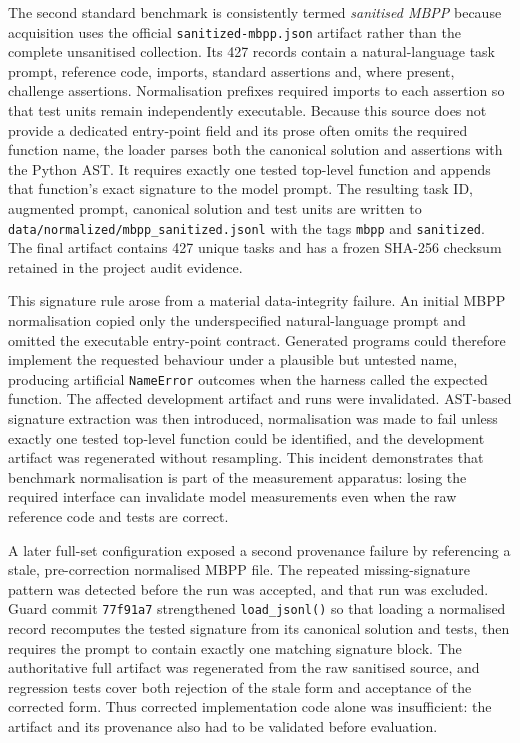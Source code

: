 The second standard benchmark is consistently termed \emph{sanitised MBPP} because acquisition uses the official \texttt{sanitized-mbpp.json} artifact rather than the complete unsanitised collection. Its 427 records contain a natural-language task prompt, reference code, imports, standard assertions and, where present, challenge assertions. Normalisation prefixes required imports to each assertion so that test units remain independently executable. Because this source does not provide a dedicated entry-point field and its prose often omits the required function name, the loader parses both the canonical solution and assertions with the Python AST. It requires exactly one tested top-level function and appends that function's exact signature to the model prompt. The resulting task ID, augmented prompt, canonical solution and test units are written to \texttt{data/normalized/mbpp\_sanitized.jsonl} with the tags \texttt{mbpp} and \texttt{sanitized}. The final artifact contains 427 unique tasks and has a frozen SHA-256 checksum retained in the project audit evidence.

This signature rule arose from a material data-integrity failure. An initial MBPP normalisation copied only the underspecified natural-language prompt and omitted the executable entry-point contract. Generated programs could therefore implement the requested behaviour under a plausible but untested name, producing artificial \texttt{NameError} outcomes when the harness called the expected function. The affected development artifact and runs were invalidated. AST-based signature extraction was then introduced, normalisation was made to fail unless exactly one tested top-level function could be identified, and the development artifact was regenerated without resampling. This incident demonstrates that benchmark normalisation is part of the measurement apparatus: losing the required interface can invalidate model measurements even when the raw reference code and tests are correct.

A later full-set configuration exposed a second provenance failure by referencing a stale, pre-correction normalised MBPP file. The repeated missing-signature pattern was detected before the run was accepted, and that run was excluded. Guard commit \texttt{77f91a7} strengthened \texttt{load\_jsonl()} so that loading a normalised record recomputes the tested signature from its canonical solution and tests, then requires the prompt to contain exactly one matching signature block. The authoritative full artifact was regenerated from the raw sanitised source, and regression tests cover both rejection of the stale form and acceptance of the corrected form. Thus corrected implementation code alone was insufficient: the artifact and its provenance also had to be validated before evaluation.

